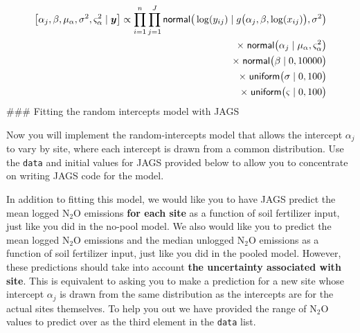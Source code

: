 \documentclass[
]{article}
\begin{document}
\[
\begin{aligned}
\bigl[ \alpha_{j},\beta, \mu_{\alpha}, \sigma^2, \varsigma_{\alpha}^2  \mid \boldsymbol{y} \bigr] \propto \prod_{i=1}^{n}  \prod_{j=1}^{J} {\sf normal} \bigr( \log(y_{ij}) \mid g \bigl( \alpha_{j}, \beta, \log(x_{ij})  \bigr), \sigma^{2}\bigr)\\
\times \; {\sf normal} \bigr(\alpha_{j} \mid \mu_{\alpha}, \varsigma_{\alpha}^2 \bigr) \\ 
\times \; {\sf normal} \bigr(\beta \mid 0,10000\bigr) \\
\times \; {\sf uniform}\bigr(\sigma \mid 0, 100 \bigl) \\
\times \; {\sf uniform}\bigr(\varsigma \mid 0, 100 \bigl)
\end{aligned}
\] \#\#\# Fitting the random intercepts model with JAGS

Now you will implement the random-intercepts model that allows the
intercept \(\alpha_{j}\) to vary by site, where each intercept is drawn
from a common distribution. Use the \texttt{data} and initial values for
JAGS provided below to allow you to concentrate on writing JAGS code for
the model.

In addition to fitting this model, we would like you to have JAGS
predict the mean logged \(\textrm{N} _2 \textrm{O}\) emissions
\textbf{for each site} as a function of soil fertilizer input, just like
you did in the no-pool model. We also would like you to predict the mean
logged \(\textrm{N} _2 \textrm{O}\) emissions and the median unlogged
\(\textrm{N} _2 \textrm{O}\) emissions as a function of soil fertilizer
input, just like you did in the pooled model. However, these predictions
should take into account \textbf{the uncertainty associated with site}.
This is equivalent to asking you to make a prediction for a new site
whose intercept \(\alpha_{j}\) is drawn from the same distribution as
the intercepts are for the actual sites themselves. To help you out we
have provided the range of \(\textrm{N} _2 \textrm{O}\) values to
predict over as the third element in the \texttt{data} list.
\end{document}
